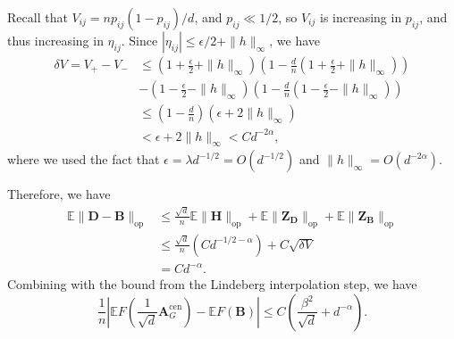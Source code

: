 \documentclass[11pt, titlepage]{article} %
\numberwithin{equation}{section}
\theoremstyle{definition}
\numberwithin{theorem}{section}
\numberwithin{lemma}{section}
\numberwithin{corollary}{section}
\numberwithin{proposition}{section}
\numberwithin{definition}{section}
\numberwithin{remark}{section}
\begin{document}
Recall that $V_{ij} = np_{ij}(1-p_{ij})/d$, and $p_{ij} \ll 1/2$, so $V_{ij}$ is increasing in $p_{ij}$,
and thus increasing in $\eta_{ij}$. Since $|\eta_{ij}| \leq \epsilon/2 + \|h\|_\infty$, we have 
\begin{align*}
\delta V = V_+ - V_- &\leq \left(1 + \frac{\epsilon}{2} + \|h\|_\infty\right)
\left(1 - \frac{d}{n}\left(1 + \frac{\epsilon}{2} + \|h\|_\infty\right)\right)\\
&- \left(1 - \frac{\epsilon}{2} - \|h\|_\infty\right)
\left(1 - \frac{d}{n}\left(1 - \frac{\epsilon}{2} - \|h\|_\infty\right)\right)\\
&\leq \left(1 - \frac{d}{n}\right)(\epsilon + 2\|h\|_\infty)\\
&<\epsilon + 2\|h\|_\infty
< C d^{-2\alpha},
\end{align*}
where we used the fact that $\epsilon = \lambda d^{-1/2} = O(d^{-1/2})$ and $\|h\|_\infty = O(d^{-2\alpha})$.

Therefore, we have
\begin{align*}
\mathbb{E} \| \bm{D} - \bm{B}\|_{\mathrm{op}}
&\leq \frac{\sqrt{d}}{n} \mathbb{E} \|\bm{H}\|_{\mathrm{op}} + \mathbb{E} \|\bm{Z_D}\|_{\mathrm{op}}
+ \mathbb{E} \|\bm{Z_B}\|_{\mathrm{op}}\\
&\leq \frac{\sqrt{d}}{n} \left(C d^{-1/2-\alpha}\right) + C \sqrt{\delta V} \\
&= Cd^{-\alpha}.
\end{align*}
Combining with the bound from the Lindeberg interpolation step, we have
\[
\frac{1}{n} \left| \mathbb{E}F\left(\frac{1}{\sqrt{d}}\bm{A}^\mathrm{cen}_{G}\right) 
- \mathbb{E}F(\bm{B})\right| \leq C\left(\frac{\beta^2}{\sqrt{d}} + d^{-\alpha}\right).
\]
\end{document}
